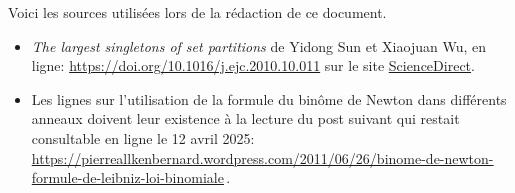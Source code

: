 Voici les sources utilisées lors de la rédaction de ce document.
%
\begin{itemize}[wide]
    \item \emph{\og The largest singletons of set partitions \fg}
de Yidong Sun et Xiaojuan Wu, en ligne:
    \url{https://doi.org/10.1016/j.ejc.2010.10.011}
    sur le site \href{https://www.sciencedirect.com/}{ScienceDirect}.

    \item Les lignes sur l'utilisation de la formule du binôme de Newton dans différents anneaux doivent leur existence à la lecture du post suivant qui restait consultable en ligne le 12 avril 2025:
    \url{https://pierreallkenbernard.wordpress.com/2011/06/26/binome-de-newton-formule-de-leibniz-loi-binomiale}\,.
\end{itemize}
